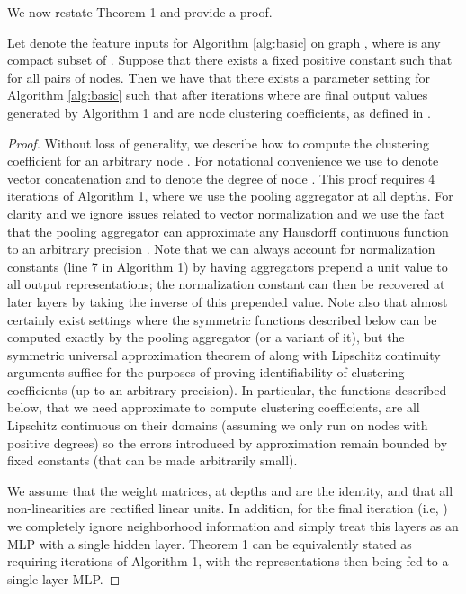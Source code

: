 We now restate Theorem 1 and provide a proof. 

\renewcommand{\thetheorem}{\ref{thm:main}}
\begin{theorem}
Let  denote the feature inputs for Algorithm \ref{alg:basic} on graph , where  is any compact subset of . Suppose that there exists a fixed positive constant  such that  for all pairs of nodes. Then we have that  there exists a parameter setting  for Algorithm \ref{alg:basic} such that after  iterations 
 where  are final output values generated by Algorithm 1 and  are node clustering coefficients, as defined in \cite{watts1998collective}. 
\end{theorem}

\begin{proof}
Without loss of generality, we describe how to compute the clustering coefficient for an arbitrary node .
For notational convenience we use  to denote vector concatenation and  to denote the degree of node .
This proof requires 4 iterations of Algorithm 1, where we use the pooling aggregator at all depths. 
For clarity and we ignore issues related to vector normalization and we use the fact that the pooling aggregator can approximate any Hausdorff continuous function to an arbitrary  precision \cite{qi2016pointnet}.
Note that we can always account for normalization constants (line 7 in Algorithm 1) by having aggregators prepend a unit value to all output representations; the normalization constant can then be recovered at later layers by taking the inverse of this prepended value. 
Note also that almost certainly exist settings where the symmetric functions described below can be computed exactly by the pooling aggregator (or a variant of it), but the symmetric universal approximation theorem of \cite{qi2016pointnet} along with Lipschitz continuity arguments suffice for the purposes of proving identifiability of clustering coefficients (up to an arbitrary precision).
In particular, the functions described below, that we need approximate to compute clustering coefficients, are all Lipschitz continuous on their domains (assuming we only run on nodes with positive degrees) so the errors introduced by approximation remain bounded by fixed constants (that can be made arbitrarily small). 

We assume that the weight matrices,  at depths  and  are the identity, and that all non-linearities are rectified linear units. 
In addition, for the final iteration (i.e, ) we completely ignore neighborhood information and simply treat this layers as an MLP with a single hidden layer.
Theorem 1 can be equivalently stated as requiring  iterations of Algorithm 1, with the representations then being fed to a single-layer MLP. 


\end{proof}
